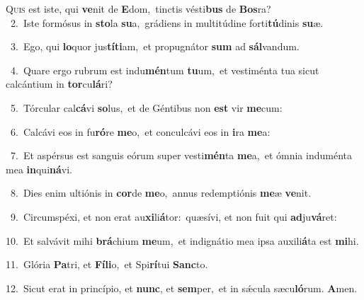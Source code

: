 \lettrine{\initial\textcolor{\initialcolor}{Q}}{uis} est iste, qui \textbf{ve}\-nit de \textbf{E}\-dom,~\star tinctis vésti\textbf{bus} de \textbf{Bos}\-ra?\\
{\numbfont\textcolor{\numbcolor}{~2.}}~Iste formósus in \textbf{sto}\-la \textbf{su}\-a,~\star grádiens in multitúdine forti\-\textbf{tú}\-dinis \textbf{su}\-æ.\par
{\numbfont\textcolor{\numbcolor}{~3.}}~Ego, qui \textbf{lo}\-quor jus\-\textbf{tí}\-\textbf{ti}am,~\star et propugnátor \textbf{sum} ad \textbf{sál}\-vandum.\par
{\numbfont\textcolor{\numbcolor}{~4.}}~Quare ergo rubrum est indu\-\textbf{mén}\-tum \textbf{tu}\-um,~\star et vestiménta tua sicut calcántium in \textbf{tor}\-cu\-\textbf{lá}\-ri?\par
{\numbfont\textcolor{\numbcolor}{~5.}}~Tórcular cal\-\textbf{cá}\-vi \textbf{so}\-lus,~\star et de Géntibus non \textbf{est} vir \textbf{me}\-cum:\par
{\numbfont\textcolor{\numbcolor}{~6.}}~Calcávi eos in fu\-\textbf{ró}\-re \textbf{me}\-o,~\star et conculcávi eos in \textbf{i}\-ra \textbf{me}\-a:\par
{\numbfont\textcolor{\numbcolor}{~7.}}~Et aspérsus est sanguis eórum super vesti\-\textbf{mén}\-ta \textbf{me}\-a,~\star et ómnia induménta mea \textbf{in}\-qui\-\textbf{ná}\-vi.\par
{\numbfont\textcolor{\numbcolor}{~8.}}~Dies enim ultiónis in \textbf{cor}\-de \textbf{me}\-o,~\star annus redemptiónis \textbf{me}\-æ \textbf{ve}\-nit.\par
{\numbfont\textcolor{\numbcolor}{~9.}}~Circumspéxi, et non erat au\-\textbf{xi}\-li\-\textbf{á}\-tor:~\star quæsívi, et non fuit qui \textbf{ad}\-ju\-\textbf{vá}\-ret:\par
{\numbfont\textcolor{\numbcolor}{10.}}~Et salvávit mihi \textbf{brá}\-chium \textbf{me}\-um,~\star et indignátio mea ipsa auxili\-\textbf{á}\-ta est \textbf{mi}\-hi.\par
{\numbfont\textcolor{\numbcolor}{11.}}~Glória \textbf{Pa}\-tri, et \textbf{Fí}\-\textbf{li}o,~\star et Spi\-\textbf{rí}\-tui \textbf{Sanc}\-to.\par
{\numbfont\textcolor{\numbcolor}{12.}}~Sicut erat in princípio, et \textbf{nunc}\-, et \textbf{sem}\-per,~\star et in sǽcula sæcu\-\textbf{ló}\-rum. \textbf{A}\-men.\par
